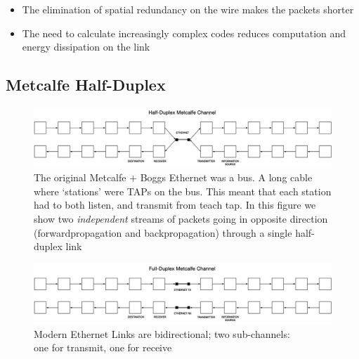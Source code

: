 \documentclass[../../../OAE-SPEC-MAIN.tex]{subfiles}
\begin{document}
\begin{itemize}
\item The elimination of spatial redundancy on the wire makes the packets shorter
\item The need to calculate increasingly complex codes reduces computation and energy dissipation on the link
\end{itemize}




\subsection{Metcalfe Half-Duplex}

\begin{figure}
\includegraphics[width=\textwidth]{FIGURES/Half-Duplex-Metcalfe.png}
  \caption{The original Metcalfe + Boggs Ethernet was a bus. A long cable where `stations' were TAPs on the bus. This meant that each station had to both listen, and transmit from teach tap. In this figure we show two \emph{independent} streams of packets going in opposite direction (forwardpropagation and backpropagation) through a single half-duplex link}
\end{figure}


\vspace{70px}



\vspace{35px}
\begin{figure}
\includegraphics[width=\textwidth]{FIGURES/Full-Duplex-Metcalfe.png}
  \caption{Modern Ethernet Links are bidirectional; two sub-channels: \\one for transmit,  one for receive}
\end{figure}
\end{document}
